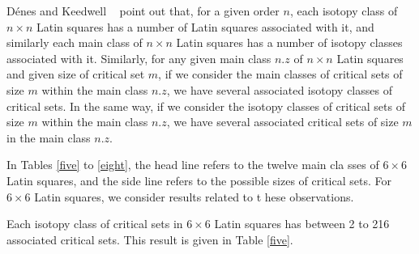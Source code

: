 
D{\'e}nes and Keedwell ~\cite{dk} point out that, for a given order $n$, each
isotopy class of $n \times n$ Latin squares has a number of Latin
squares associated with it, and similarly each main class of $n \times
n$ Latin squares has a number of isotopy classes associated with it.
Similarly, for any given main class $n.z$ of $n \times n$ Latin squares
and given size of critical set $m$, if we consider the main classes of
critical sets of size $m$ within the main class $n.z$, we have several
associated isotopy classes of critical sets.  In the same way, if we
consider the isotopy classes of critical sets of size $m$ within the
main class $n.z$, we have several associated critical sets of size $m$
in the main class $n.z$.

In Tables \ref{five} to \ref{eight}, the head line refers to the twelve main cla
sses of $6 \times
6$ Latin squares, and the side line refers to the possible sizes of
critical sets.  For $6 \times 6$ Latin squares, we consider results related to t
hese observations.

Each isotopy class of critical sets in $6 \times 6$ Latin squares has between
2 to 216 associated critical sets.  This result is given in Table \ref{five}.


